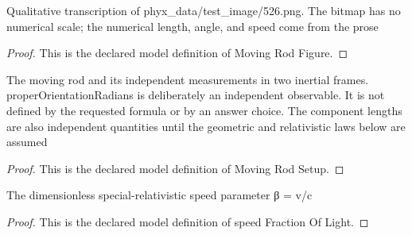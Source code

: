 \begin{definition}
  \label{def:physics:phyx-mini-0526:phyxminiproblems-problemphyxmini0526-movingrodfigure}
  Qualitative transcription of phyx\_data/test\_image/526.png. The bitmap has no numerical scale; the numerical length, angle, and speed come from the prose
\end{definition}
\begin{proof}
  This is the declared model definition of Moving Rod Figure.
\end{proof}
\begin{definition}
  \label{def:physics:phyx-mini-0526:phyxminiproblems-problemphyxmini0526-movingrodsetup}
  The moving rod and its independent measurements in two inertial frames. properOrientationRadians is deliberately an independent observable. It is not defined by the requested formula or by an answer choice. The component lengths are also independent quantities until the geometric and relativistic laws below are assumed
\end{definition}
\begin{proof}
  This is the declared model definition of Moving Rod Setup.
\end{proof}
\begin{definition}
  \label{def:physics:phyx-mini-0526:phyxminiproblems-problemphyxmini0526-speedfractionoflight}
  The dimensionless special-relativistic speed parameter β = v/c
\end{definition}
\begin{proof}
  This is the declared model definition of speed Fraction Of Light.
\end{proof}
